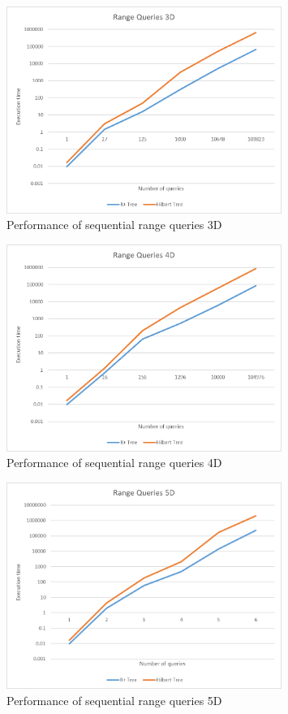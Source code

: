 \documentclass[11pt, a4paper, oneside]{article}
\begin{document}
\begin{enumerate}
\begin{figure}[H]
  \centering
    \includegraphics[width=0.8\textwidth]{img/range3d}
      \caption{Performance of sequential range queries 3D }
  \label{fig:range3D}
\end{figure}

\begin{figure}[H]
  \centering
    \includegraphics[width=0.8\textwidth]{img/range4d}
      \caption{Performance of sequential range queries 4D }
  \label{fig:range4D}
\end{figure}

\begin{figure}[H]
  \centering
    \includegraphics[width=0.8\textwidth]{img/range5d}
      \caption{Performance of sequential range queries 5D }
  \label{fig:range5D}
\end{figure}


\end{enumerate}
\end{document}
